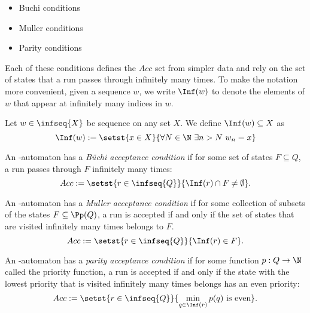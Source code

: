 \begin{multicols}{2}
\begin{itemize}
    \item Buchi conditions
    \item Muller conditions
    \item Parity conditions
\end{itemize}
\end{multicols}

Each of these conditions defines the $Acc$ set
from simpler data and rely on the set of states that
a run passes through infinitely many times.
To make the notation more convenient, given a sequence
$w$, we write $\Inf(w)$ to denote the
elements of $w$ that appear at infinitely many indices in $w$.

\begin{definition}
    Let $w \in \infseq{X}$ be sequence on any set $X$.
    We define $\Inf(w) \subseteq X$ as
    \[
        \Inf(w) := \setst{x \in X}{
            \forall N \in \N~
            \exists n > N~
            w_n = x
        }
    \]
\end{definition}

\begin{definition}
    An \w-automaton has a \emph{Büchi acceptance condition}
    if for some set of states $F \subseteq Q$,
    a run passes through $F$ infinitely many times:
    \[
        Acc := \setst{
            r \in \infseq{Q}
        }{
            \Inf(r) \cap F \neq \emptyset
        }.
    \]

    An \w-automaton has a \emph{Muller acceptance condition}
    if for some collection of subsets of the states $F \subseteq \Pp(Q)$,
    a run is accepted if and only if the set of states that
    are visited infinitely many times belongs to $F$.
    \[
        Acc := \setst{
            r \in \infseq{Q}
        }{
            \Inf(r) \in F
        }.
    \]

    An \w-automaton has a \emph{parity acceptance condition}
    if for some function $p : Q \to \N$ called the priority function,
    a run is accepted if and only if the state with the lowest priority
    that is visited infinitely many times belongs has an even priority:
    \[
        Acc := \setst{
            r \in \infseq{Q}
        }{
            \min_{q \in \Inf(r)} p(q) \text{ is even}
        }.
    \]
\end{definition}

